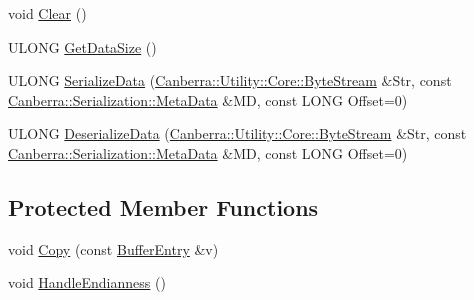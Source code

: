 \begin{DoxyCompactItemize}
\item 
void \hyperlink{class_canberra_1_1_data_types_1_1_spectroscopy_1_1_s_c_abuffer_1_1_buffer_entry_ab601aea872106946d1aed9ea9cbaed34_ab601aea872106946d1aed9ea9cbaed34}{Clear} ()
\item 
U\+L\+O\+NG \hyperlink{class_canberra_1_1_data_types_1_1_spectroscopy_1_1_s_c_abuffer_1_1_buffer_entry_aafed5052137dc51df72848cb419b7a93_aafed5052137dc51df72848cb419b7a93}{Get\+Data\+Size} ()
\item 
U\+L\+O\+NG \hyperlink{class_canberra_1_1_data_types_1_1_spectroscopy_1_1_s_c_abuffer_1_1_buffer_entry_a94b48a2e72e5f2da2e63de970e59f03d_a94b48a2e72e5f2da2e63de970e59f03d}{Serialize\+Data} (\hyperlink{class_canberra_1_1_utility_1_1_core_1_1_byte_stream}{Canberra\+::\+Utility\+::\+Core\+::\+Byte\+Stream} \&Str, const \hyperlink{class_canberra_1_1_serialization_1_1_meta_data}{Canberra\+::\+Serialization\+::\+Meta\+Data} \&MD, const L\+O\+NG Offset=0)
\item 
U\+L\+O\+NG \hyperlink{class_canberra_1_1_data_types_1_1_spectroscopy_1_1_s_c_abuffer_1_1_buffer_entry_a99073f892171876a20a35b73150a145a_a99073f892171876a20a35b73150a145a}{Deserialize\+Data} (\hyperlink{class_canberra_1_1_utility_1_1_core_1_1_byte_stream}{Canberra\+::\+Utility\+::\+Core\+::\+Byte\+Stream} \&Str, const \hyperlink{class_canberra_1_1_serialization_1_1_meta_data}{Canberra\+::\+Serialization\+::\+Meta\+Data} \&MD, const L\+O\+NG Offset=0)
\end{DoxyCompactItemize}
\subsection*{Protected Member Functions}
\begin{DoxyCompactItemize}
\item 
void \hyperlink{class_canberra_1_1_data_types_1_1_spectroscopy_1_1_s_c_abuffer_1_1_buffer_entry_a93df0ddca5c24fe2c3890bf2eb44a8a0_a93df0ddca5c24fe2c3890bf2eb44a8a0}{Copy} (const \hyperlink{class_canberra_1_1_data_types_1_1_spectroscopy_1_1_s_c_abuffer_1_1_buffer_entry}{Buffer\+Entry} \&v)
\item 
void \hyperlink{class_canberra_1_1_data_types_1_1_spectroscopy_1_1_s_c_abuffer_1_1_buffer_entry_abb874f7cb212076fa6b354e140f8c490_abb874f7cb212076fa6b354e140f8c490}{Handle\+Endianness} ()
\end{DoxyCompactItemize}
